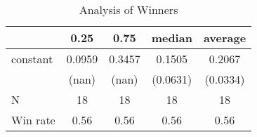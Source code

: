 \begin{table}
\caption{Analysis of Winners}
\begin{center}
\begin{tabular}{lcccc}
\hline
         &  0.25  &  0.75  &  median  & average   \\
\midrule
\midrule
constant & 0.0959 & 0.3457 & 0.1505   & 0.2067    \\
         & (nan)  & (nan)  & (0.0631) & (0.0334)  \\
N        & 18     & 18     & 18       & 18        \\
Win rate & 0.56   & 0.56   & 0.56     & 0.56      \\
\hline
\end{tabular}
\end{center}
\end{table}